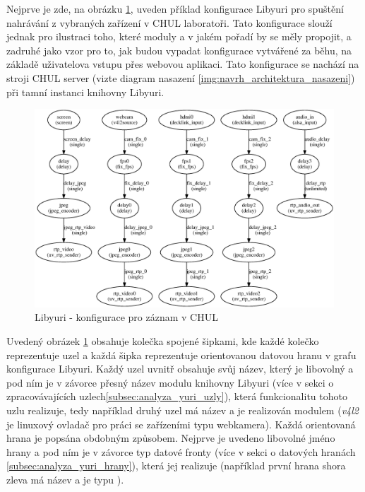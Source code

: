 \documentclass[thesis=M,czech]{FITthesis}[2012/06/26]
\begin{document}
Nejprve je zde, na obrázku \ref{img:navrh_backend_libyuri_sender}, uveden příklad konfigurace Libyuri pro spuštění nahrávání z vybraných zařízení v CHUL laboratoři. Tato konfigurace slouží jednak pro ilustraci toho, které moduly a v jakém pořadí by se měly propojit, a zadruhé jako vzor pro to, jak budou vypadat konfigurace vytvářené za běhu, na základě uživatelova vstupu přes webovou aplikaci. Tato konfigurace se nachází na stroji CHUL server (vizte diagram nasazení \ref{img:navrh_architektura_nasazeni}) při tamní instanci knihovny Libyuri. 
\\
\begin{figure}[h]\centering
	\includegraphics[width=1\textwidth]{images/ulab_sender.eps}
	\caption{Libyuri - konfigurace pro záznam v CHUL}\label{img:navrh_backend_libyuri_sender}
\end{figure}

Uvedený obrázek \ref{img:navrh_backend_libyuri_sender} obsahuje kolečka spojené šipkami, kde každé kolečko reprezentuje uzel a každá šipka reprezentuje orientovanou datovou hranu v grafu konfigurace Libyuri. Každý uzel uvnitř obsahuje svůj název, který je libovolný a pod ním je v závorce přesný název modulu knihovny Libyuri (více v sekci o zpracovávajících uzlech\ref{subsec:analyza_yuri_uzly}), která funkcionalitu tohoto uzlu realizuje, tedy například druhý uzel má název  a je realizován modulem  (\textit{v4l2} je linuxový ovladač pro práci se zařízeními typu webkamera). Každá orientovaná hrana je popsána obdobným způsobem. Nejprve je uvedeno libovolné jméno hrany a pod ním je v závorce typ datové fronty (více v sekci o datových hranách \ref{subsec:analyza_yuri_hrany}), která jej realizuje (například první hrana shora zleva má název  a je typu ).
\end{document}

